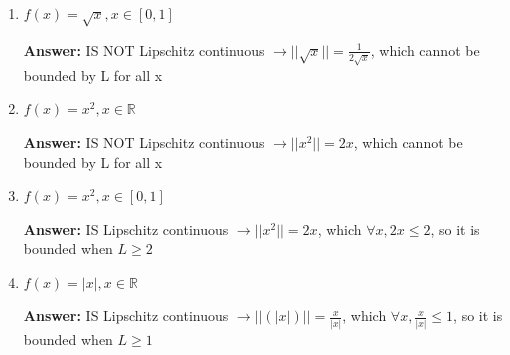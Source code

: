 \documentclass{assignment}
\newcommand{\R}{\mathbb{R}}
\begin{document}
\begin{problem}
\begin{enumerate}
\begin{enumerate}[label=(\alph*)]

        
        \item $f(x) = \sqrt{x}, x \in [0,1]$

        \color{blue}\textbf{Answer:} IS NOT Lipschitz continuous $\rightarrow ||\sqrt{x}|| = \frac{1}{2\sqrt{x}}$, which cannot be bounded by L for all x \color{black}


        
        \item $f(x) = x^2, x \in \R$

        \color{blue}\textbf{Answer:} IS NOT Lipschitz continuous $\rightarrow ||x^2|| = 2x$, which cannot be bounded by L for all x \color{black}


        
        \item $f(x) = x^2, x \in [0,1]$

        \color{blue}\textbf{Answer:} IS Lipschitz continuous $\rightarrow ||x^2|| = 2x$, which $\forall x, 2x \leq 2$, so it is bounded when $L \geq 2$ \color{black}



        \item $f(x) = |x|, x \in \R$

        \color{blue}\textbf{Answer:} IS Lipschitz continuous $\rightarrow ||(|x|)|| = \frac{x}{|x|}$, which $\forall x, \frac{x}{|x|} \leq 1$, so it is bounded when $L \geq 1$\color{black}


        

\end{enumerate}
\end{enumerate}
\end{problem}
\end{document}
